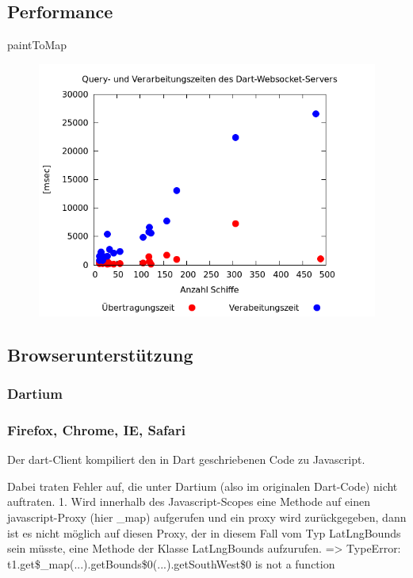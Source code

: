 \subsection{Performance}
paintToMap



\begin {figure}[H]
\begin{center}
  \includegraphics[width=5in]{images/dart.png}
\end{center}
\end {figure}


\subsection{Browserunterstützung}
\subsubsection{Dartium}

\subsubsection{Firefox, Chrome, IE, Safari}

Der dart-Client kompiliert den in Dart geschriebenen Code zu Javascript.

Dabei traten Fehler auf, die unter Dartium (also im originalen Dart-Code) nicht auftraten.
1. Wird innerhalb des Javascript-Scopes eine Methode auf einen javascript-Proxy (hier \_map) aufgerufen und ein proxy wird zurückgegeben, dann ist es nicht möglich auf diesen Proxy, der in diesem Fall vom Typ LatLngBounds sein müsste, eine Methode der Klasse LatLngBounds aufzurufen. => TypeError: t1.get\$\_map(...).getBounds\$0(...).getSouthWest\$0 is not a function

